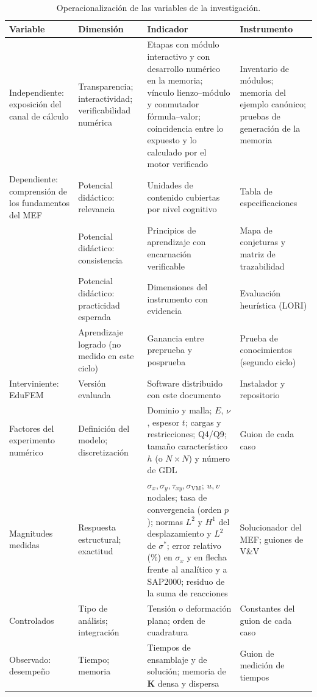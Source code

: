 \begin{table}[htbp]
\centering
\caption{Operacionalización de las variables de la investigación.}
\label{tab:variables}
{\footnotesize
\setlength{\tabcolsep}{3pt}
\renewcommand{\arraystretch}{1.15}
\begin{tabular}{@{}>{\raggedright\arraybackslash}p{2.9cm}>{\raggedright\arraybackslash}p{3.0cm}>{\raggedright\arraybackslash}p{5.0cm}>{\raggedright\arraybackslash}p{2.7cm}@{}}
\toprule
\textbf{Variable} & \textbf{Dimensión} & \textbf{Indicador} & \textbf{Instrumento} \\
\midrule
Independiente: exposición del canal de cálculo & Transparencia; interactividad; verificabilidad numérica & Etapas con módulo interactivo y con desarrollo numérico en la memoria; vínculo lienzo--módulo y conmutador fórmula--valor; coincidencia entre lo expuesto y lo calculado por el motor verificado & Inventario de módulos; memoria del ejemplo canónico; pruebas de generación de la memoria \\
Dependiente: comprensión de los fundamentos del MEF & Potencial didáctico: relevancia & Unidades de contenido cubiertas por nivel cognitivo & Tabla de especificaciones \\
 & Potencial didáctico: consistencia & Principios de aprendizaje con encarnación verificable & Mapa de conjeturas y matriz de trazabilidad \\
 & Potencial didáctico: practicidad esperada & Dimensiones del instrumento con evidencia & Evaluación heurística (LORI) \\
 & Aprendizaje logrado (no medido en este ciclo) & Ganancia entre preprueba y posprueba & Prueba de conocimientos (segundo ciclo) \\
Interviniente: EduFEM & Versión evaluada & Software distribuido con este documento & Instalador y repositorio \\
\midrule
Factores del experimento numérico & Definición del modelo; discretización & Dominio y malla; $E$, $\nu$, espesor $t$; cargas y restricciones; Q4/Q9; tamaño característico $h$ (o $N\times N$) y número de GDL & Guion de cada caso \\
Magnitudes medidas & Respuesta estructural; exactitud & $\sigma_x,\sigma_y,\tau_{xy},\sigma_{\mathrm{VM}}$; $u,v$ nodales; tasa de convergencia (orden $p$); normas $L^2$ y $H^1$ del desplazamiento y $L^2$ de $\sigma^*$; error relativo (\%) en $\sigma_x$ y en flecha frente al analítico y a SAP2000; residuo de la suma de reacciones & Solucionador del MEF; guiones de V\&V \\
Controlados & Tipo de análisis; integración & Tensión o deformación plana; orden de cuadratura & Constantes del guion de cada caso \\
Observado: desempeño & Tiempo; memoria & Tiempos de ensamblaje y de solución; memoria de $\bm{K}$ densa y dispersa & Guion de medición de tiempos \\
\bottomrule
\end{tabular}}
\end{table}

